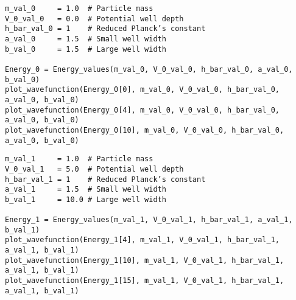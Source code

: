 \documentclass[11pt]{article}
\begin{document}
\begin{verbatim}
m_val_0     = 1.0  # Particle mass
V_0_val_0   = 0.0  # Potential well depth
h_bar_val_0 = 1    # Reduced Planck’s constant
a_val_0     = 1.5  # Small well width
b_val_0     = 1.5  # Large well width

Energy_0 = Energy_values(m_val_0, V_0_val_0, h_bar_val_0, a_val_0, b_val_0)
plot_wavefunction(Energy_0[0], m_val_0, V_0_val_0, h_bar_val_0, a_val_0, b_val_0)
plot_wavefunction(Energy_0[4], m_val_0, V_0_val_0, h_bar_val_0, a_val_0, b_val_0)
plot_wavefunction(Energy_0[10], m_val_0, V_0_val_0, h_bar_val_0, a_val_0, b_val_0)
\end{verbatim}

\label{org8d5694f}
\begin{center}

\end{center}
\begin{center}

\end{center}
\begin{center}

\end{center}

\begin{verbatim}
m_val_1     = 1.0  # Particle mass
V_0_val_1   = 5.0  # Potential well depth
h_bar_val_1 = 1    # Reduced Planck’s constant
a_val_1     = 1.5  # Small well width
b_val_1     = 10.0 # Large well width

Energy_1 = Energy_values(m_val_1, V_0_val_1, h_bar_val_1, a_val_1, b_val_1)
plot_wavefunction(Energy_1[4], m_val_1, V_0_val_1, h_bar_val_1, a_val_1, b_val_1)
plot_wavefunction(Energy_1[10], m_val_1, V_0_val_1, h_bar_val_1, a_val_1, b_val_1)
plot_wavefunction(Energy_1[15], m_val_1, V_0_val_1, h_bar_val_1, a_val_1, b_val_1)
\end{verbatim}

\label{orgef2f894}
\begin{center}

\end{center}
\begin{center}

\end{center}
\begin{center}

\end{center}
\end{document}
